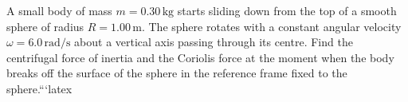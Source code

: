 \item A small body of mass \( m = 0.30 \, \text{kg} \) starts sliding down from the top of a smooth sphere of radius \( R = 1.00 \, \text{m} \). The sphere rotates with a constant angular velocity \( \omega = 6.0 \, \text{rad/s} \) about a vertical axis passing through its centre. Find the centrifugal force of inertia and the Coriolis force at the moment when the body breaks off the surface of the sphere in the reference frame fixed to the sphere.```latex
\begin{solution}
    \begin{center}
    \end{center}
    

\end{solution}
